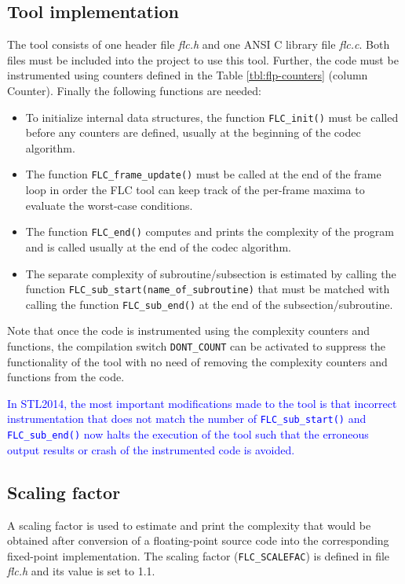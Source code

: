 \subsection{Tool implementation}
The tool consists of one header file \textit{flc.h} and one ANSI C library 
file \textit{flc.c}. Both files must be included into the project to use 
this tool. Further, the code must be instrumented using counters defined 
in the Table \ref{tbl:flp-counters} (column Counter). Finally the following 
functions are needed:
\begin{itemize}
	\item To initialize internal data structures, the function 
	{\tt FLC\_init()} must be called before any counters are defined, 
	usually at the beginning of the codec algorithm.
	\item The function {\tt FLC\_frame\_update()} must be called at the 
	end of the frame loop in order the FLC tool can keep track of the 
	per-frame maxima to evaluate the worst-case conditions.
	\item The function {\tt FLC\_end()} computes and prints the complexity 
	of the program and is called usually at the end of the codec algorithm.
	\item The separate complexity of subroutine/subsection is estimated by 
	calling the function {\tt FLC\_sub\_start(name\_of\_subroutine)} that 
	must be matched with calling the function {\tt FLC\_sub\_end()} at 
	the end of the subsection/subroutine.
\end{itemize}

Note that once the code is instrumented using the complexity counters
and functions, the compilation switch {\tt DONT\_COUNT} can be
activated to suppress the functionality of the tool with no need of
removing the complexity counters and functions from the code.

\textcolor{blue}{
%
In STL2014, the most important modifications made to the tool is
that incorrect instrumentation that does not match the number of
{\tt FLC\_sub\_start()} and {\tt FLC\_sub\_end()} now halts the
execution of the tool such that the erroneous output results or
crash of the instrumented code is avoided.
%
}

\subsection{Scaling factor}
A scaling factor is used to estimate and print the complexity that
would be obtained after conversion of a floating-point source code
into the corresponding fixed-point implementation. The scaling factor
({\tt FLC\_SCALEFAC}) is defined in file \textit{flc.h} and its value
is set to 1.1.

